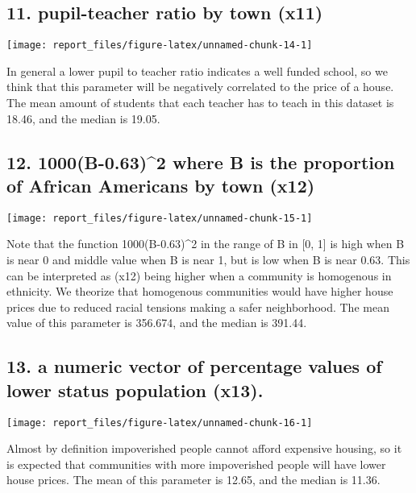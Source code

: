 \documentclass[]{article}
\begin{document}
\subsection{11. pupil-teacher ratio by town
(x11)}\label{pupil-teacher-ratio-by-town-x11}

\begin{center}\texttt{[image: report\_files/figure-latex/unnamed-chunk-14-1]} \end{center}

In general a lower pupil to teacher ratio indicates a well funded
school, so we think that this parameter will be negatively correlated to
the price of a house. The mean amount of students that each teacher has
to teach in this dataset is 18.46, and the median is 19.05.

\subsection{12. 1000(B-0.63)\^{}2 where B is the proportion of African
Americans by town
(x12)}\label{b-0.632-where-b-is-the-proportion-of-african-americans-by-town-x12}

\begin{center}\texttt{[image: report\_files/figure-latex/unnamed-chunk-15-1]} \end{center}

Note that the function 1000(B-0.63)\^{}2 in the range of B in {[}0, 1{]}
is high when B is near 0 and middle value when B is near 1, but is low
when B is near 0.63. This can be interpreted as (x12) being higher when
a community is homogenous in ethnicity. We theorize that homogenous
communities would have higher house prices due to reduced racial
tensions making a safer neighborhood. The mean value of this parameter
is 356.674, and the median is 391.44.

\subsection{13. a numeric vector of percentage values of lower status
population
(x13).}\label{a-numeric-vector-of-percentage-values-of-lower-status-population-x13.}

\begin{center}\texttt{[image: report\_files/figure-latex/unnamed-chunk-16-1]} \end{center}

Almost by definition impoverished people cannot afford expensive
housing, so it is expected that communities with more impoverished
people will have lower house prices. The mean of this parameter is
12.65, and the median is 11.36.
\end{document}
